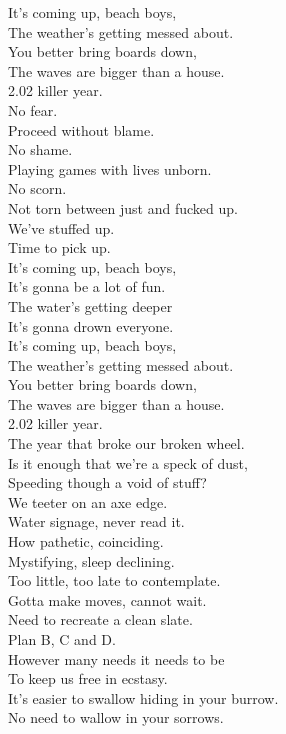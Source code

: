 It's coming up, beach boys, \\
The weather's getting messed about. \\
You better bring boards down, \\
The waves are bigger than a house. \\

2.02 killer year. \\
No fear. \\
Proceed without blame. \\
No shame. \\
Playing games with lives unborn. \\
No scorn. \\
Not torn between just and fucked up. \\
We've stuffed up. \\
Time to pick up. \\

It's coming up, beach boys, \\
It's gonna be a lot of fun. \\
The water's getting deeper \\
It's gonna drown everyone. \\

It's coming up, beach boys, \\
The weather's getting messed about. \\
You better bring boards down, \\
The waves are bigger than a house. \\

2.02 killer year. \\
The year that broke our broken wheel. \\
Is it enough that we're a speck of dust, \\
Speeding though a void of stuff? \\
We teeter on an axe edge. \\

Water signage, never read it. \\
How pathetic, coinciding. \\
Mystifying, sleep declining. \\
Too little, too late to contemplate. \\

Gotta make moves, cannot wait. \\
Need to recreate a clean slate. \\
Plan B, C and D. \\
However many needs it needs to be \\
To keep us free in ecstasy. \\
It's easier to swallow hiding in your burrow. \\
No need to wallow in your sorrows. \\

